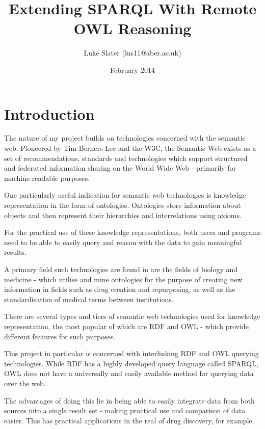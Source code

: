 \documentclass{article}
\begin{document}
\setlength{\parskip}{\medskipamount}
\setlength{\parindent}{0pt}

\title{Extending SPARQL With Remote OWL Reasoning}
\author{Luke Slater (lus11@aber.ac.uk)}
\date{February 2014}

\maketitle

\pagebreak

\section{Introduction}

The nature of my project builds on technologies concerned with the semantic web.
Pioneered by Tim Berners-Lee and the W3C, the Semantic Web exists as a set of
recommendations, standards and technologies which support structured and
federated information sharing on the World Wide Web - primarily for
machine-readable purposes.

One particularly useful indication for semantic web technologies is knowledge
representation in the form of ontologies. Ontologies store information about
objects and then represent their hierarchies and interrelations using axioms.

For the practical use of these knowledge representations, both users and
programs need to be able to easily query and reason with the data to gain
meaningful results. 

A primary field such technologies are found in are the fields of biology and
medicine - which utilise and mine ontologies for the purpose of creating new
information in fields such as drug creation and repurposing, as well as the
standardisation of medical terms between institutions.

There are several types and tiers of semantic web technologies used for
knowledge representation, the most popular of which are RDF and OWL - which
provide different features for such purposes.

This project in particular is concerned with interlinking RDF and OWL querying
technologies. While RDF has a highly developed query language
called SPARQL, OWL does not have a universally and easily available method for
querying data over the web.

The advantages of doing this lie in being able to easily integrate data from
both sources into a single result set - making practical use and comparison of
data easier. This has practical applications in the real of drug discovery, for
example.
\end{document}
